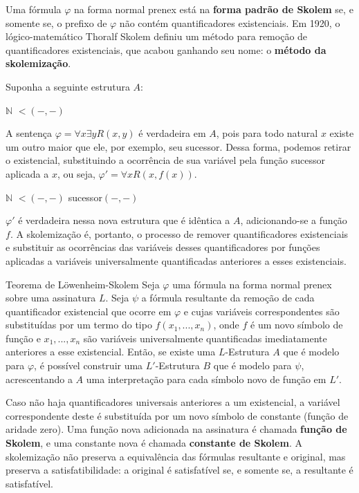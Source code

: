 Uma fórmula $\varphi$ na forma normal prenex está na \textbf{forma padrão de Skolem} se, e somente se, o prefixo de $\varphi$ não contém quantificadores existenciais. Em 1920, o lógico-matemático Thoralf Skolem definiu um método para remoção de quantificadores existenciais, que acabou ganhando seu nome: o \textbf{método da skolemização}.

Suponha a seguinte estrutura $A$:
\begin{center}
    \begin{structure}
        {$\mathbb{N}$}
        {}
        {$<$$(-,-)$}
        {}
        {}    
    \end{structure}
\end{center}


A sentença $\varphi = \forall x \exists y R(x,y)$ é verdadeira em $A$, pois para todo natural $x$ existe um outro maior que ele, por exemplo, seu sucessor. Dessa forma, podemos retirar o existencial, substituindo a ocorrência de sua variável pela função sucessor aplicada a $x$, ou seja, $\varphi' = \forall x R(x,f(x))$.
\begin{center}
    \begin{structure}
        {$\mathbb{N}$}
        {}
        {$<$$(-,-)$}
        {}
        {sucessor$(-,-)$}    
    \end{structure}
\end{center}

$\varphi'$ é verdadeira nessa nova estrutura que é idêntica a $A$, adicionando-se a função $f$. A skolemização é, portanto, o processo de remover quantificadores existenciais e substituir as ocorrências das variáveis desses quantificadores por funções aplicadas a variáveis universalmente quantificadas anteriores a esses existenciais.

\begin{theorem}{Teorema de Löwenheim-Skolem}
    Seja $\varphi$ uma fórmula na forma normal prenex sobre uma assinatura $L$. Seja $\psi$ a fórmula resultante da remoção de cada quantificador existencial que ocorre em $\varphi$ e cujas variáveis correspondentes são substituídas por um termo do tipo $f(x_1,...,x_n)$, onde $f$ é um novo símbolo de função e $x_1,...,x_n$ são variáveis universalmente quantificadas imediatamente anteriores a esse existencial. Então, se existe uma $L$-Estrutura $A$ que é modelo para $\varphi$, é possível construir uma $L'$-Estrutura $B$ que é modelo para $\psi$, acrescentando a $A$ uma interpretação para cada símbolo novo de função em $L'$.
\end{theorem}
Caso não haja quantificadores universais anteriores a um existencial, a variável correspondente deste é substituída por um novo símbolo de constante (função de aridade zero). Uma função nova adicionada na assinatura é chamada \textbf{função de Skolem}, e uma constante nova é chamada \textbf{constante de Skolem}. A skolemização não preserva a equivalência das fórmulas resultante e original, mas preserva a satisfatibilidade: a original é satisfatível se, e somente se, a resultante é satisfatível.

